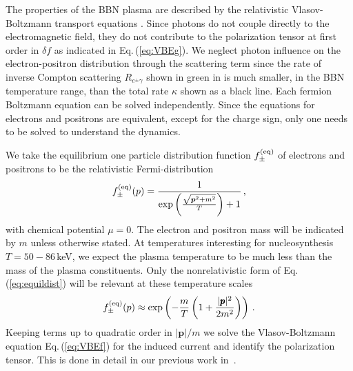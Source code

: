 \label{sec:kinetic_theory}
The properties of the BBN plasma are described by the relativistic Vlasov-Boltzmann transport equations . Since photons do not couple directly to the electromagnetic field, they do not contribute to the polarization tensor at first order in $\delta f$ as indicated in Eq.\,(\ref{eq:VBEg}). We neglect photon influence on the electron-positron distribution through the scattering term since the rate of inverse Compton scattering $R_{e^{\pm}\gamma }$ shown in green in  is much smaller, in the BBN temperature range, than the total rate $\kappa$ shown as a black line. Each fermion Boltzmann equation  can be solved independently. Since the equations for electrons and positrons are equivalent, except for the charge sign, only one needs to be solved to understand the dynamics.

We take the equilibrium one particle distribution function $f_\pm^{(\mathrm{eq})}$ of electrons and positrons to be the relativistic Fermi-distribution
\begin{equation}\label{eq:equildist}
f^{(\mathrm{eq})}_\pm(p) = \frac{1}{\exp{\left(\frac{\sqrt{\boldsymbol{p}^2 + m^2}}{T}\right)}
+1}\,,
\end{equation}
with chemical potential $\mu = 0 $. The electron and positron mass will be indicated by $m$ unless otherwise stated. At temperatures interesting for nucleosynthesis $T = 50-86$\,keV, we expect the plasma temperature to be much less than the mass of the plasma constituents. Only the nonrelativistic form of Eq.\,(\ref{eq:equildist}) will be relevant at these temperature scales
\begin{equation}
f^{(\mathrm{eq})}_\pm(p) \approx \exp\left(- \frac{m}{T}\left(1+\frac{|\pmb{p}|^2}{2m^2}\right)\right)\,.
\end{equation}
Keeping terms up to quadratic order in $|\boldsymbol{p}|/m$ we solve the Vlasov-Boltzmann equation Eq.\,(\ref{eq:VBEf}) for the induced current and identify the polarization tensor. This is done in detail in our previous work in~\cite{Formanek:2021blc}.

